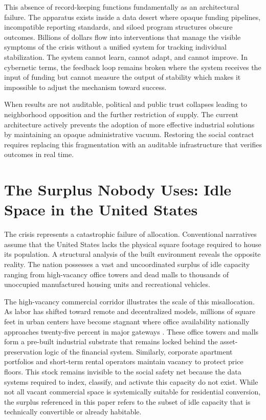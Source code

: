 \documentclass[12pt, letterpaper]{article}
\begin{document}
This absence of record-keeping functions fundamentally as an architectural failure. The apparatus exists inside a data desert where opaque funding pipelines, incompatible reporting standards, and siloed program structures obscure outcomes. Billions of dollars flow into interventions that manage the visible symptoms of the crisis without a unified system for tracking individual stabilization. The system cannot learn, cannot adapt, and cannot improve. In cybernetic terms, the feedback loop remains broken where the system receives the input of funding but cannot measure the output of stability which makes it impossible to adjust the mechanism toward success.

When results are not auditable, political and public trust collapses leading to neighborhood opposition and the further restriction of supply. The current architecture actively prevents the adoption of more effective industrial solutions by maintaining an opaque administrative vacuum. Restoring the social contract requires replacing this fragmentation with an auditable infrastructure that verifies outcomes in real time.

\section{The Surplus Nobody Uses: Idle Space in the United States}

The crisis represents a catastrophic failure of allocation. Conventional narratives assume that the United States lacks the physical square footage required to house its population. A structural analysis of the built environment reveals the opposite reality. The nation possesses a vast and uncoordinated surplus of idle capacity ranging from high-vacancy office towers and dead malls to thousands of unoccupied manufactured housing units and recreational vehicles.

The high-vacancy commercial corridor illustrates the scale of this misallocation. As labor has shifted toward remote and decentralized models, millions of square feet in urban centers have become stagnant where office availability nationally approaches twenty-five percent in major gateways \citep{moodys_cre_2024}. These office towers and malls form a pre-built industrial substrate that remains locked behind the asset-preservation logic of the financial system. Similarly, corporate apartment portfolios and short-term rental operators maintain vacancy to protect price floors. This stock remains invisible to the social safety net because the data systems required to index, classify, and activate this capacity do not exist. While not all vacant commercial space is systemically suitable for residential conversion, the surplus referenced in this paper refers to the subset of idle capacity that is technically convertible or already habitable.
\end{document}
